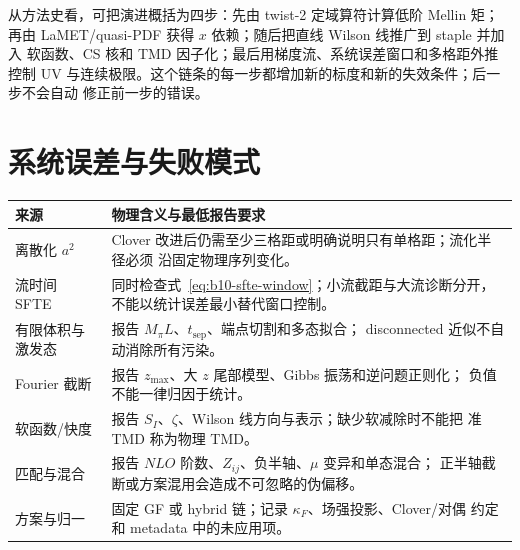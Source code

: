 从方法史看，可把演进概括为四步：先由 twist-2 定域算符计算低阶 Mellin 矩；
再由 LaMET/quasi-PDF 获得 $x$ 依赖；随后把直线 Wilson 线推广到 staple 并加入
软函数、CS 核和 TMD 因子化；最后用梯度流、系统误差窗口和多格距外推控制 UV
与连续极限。这个链条的每一步都增加新的标度和新的失效条件；后一步不会自动
修正前一步的错误。

\section{系统误差与失败模式}

\begin{tabularx}{\textwidth}{@{}p{}X@{}}
\toprule
来源 & 物理含义与最低报告要求 \\
\midrule
离散化 $a^2$ & Clover 改进后仍需至少三格距或明确说明只有单格距；流化半径必须
沿固定物理序列变化。 \\
流时间 SFTE & 同时检查式~\eqref{eq:b10-sfte-window}；小流截距与大流诊断分开，
不能以统计误差最小替代窗口控制。 \\
有限体积与激发态 & 报告 $M_\pi L$、$t_{\mathrm{sep}}$、端点切割和多态拟合；
disconnected 近似不自动消除所有污染。 \\
Fourier 截断 & 报告 $z_{\max}$、大 $z$ 尾部模型、Gibbs 振荡和逆问题正则化；
负值不能一律归因于统计。 \\
软函数/快度 & 报告 $S_I$、$\zeta$、Wilson 线方向与表示；缺少软减除时不能把
准 TMD 称为物理 TMD。 \\
匹配与混合 & 报告 $NLO$ 阶数、$Z_{ij}$、负半轴、$\mu$ 变异和单态混合；
正半轴截断或方案混用会造成不可忽略的伪偏移。 \\
方案与归一 & 固定 GF 或 hybrid 链；记录 $\kappa_F$、场强投影、Clover/对偶
约定和 metadata 中的未应用项。 \\
\bottomrule
\end{tabularx}

